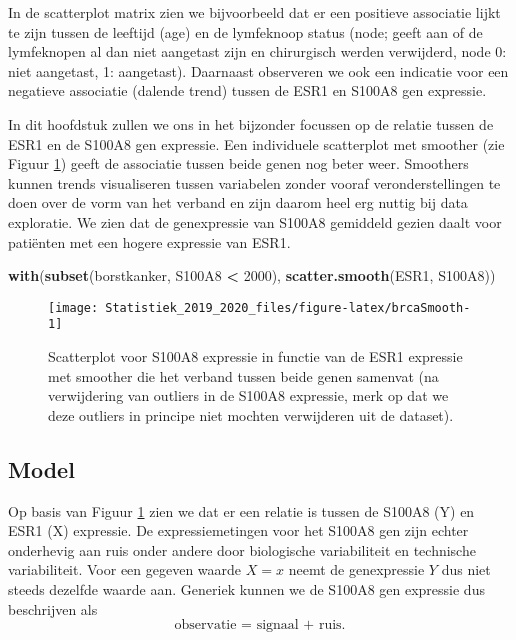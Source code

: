 \documentclass[12pt,dutch,coursenotes]{book}
\newenvironment{Shaded}{\begin{snugshade}}{\end{snugshade}}
\newcommand{\KeywordTok}[1]{\textcolor[rgb]{0.13,0.29,0.53}{\textbf{#1}}}
\newcommand{\DecValTok}[1]{\textcolor[rgb]{0.00,0.00,0.81}{#1}}
\newcommand{\StringTok}[1]{\textcolor[rgb]{0.31,0.60,0.02}{#1}}
\newcommand{\OperatorTok}[1]{\textcolor[rgb]{0.81,0.36,0.00}{\textbf{#1}}}
\newcommand{\NormalTok}[1]{#1}
\theoremstyle{definition}
\theoremstyle{definition}
\theoremstyle{definition}
\theoremstyle{remark}
\begin{document}
In de scatterplot matrix zien we bijvoorbeeld dat er een positieve
associatie lijkt te zijn tussen de leeftijd (age) en de lymfeknoop
status (node; geeft aan of de lymfeknopen al dan niet aangetast zijn en
chirurgisch werden verwijderd, node 0: niet aangetast, 1: aangetast).
Daarnaast observeren we ook een indicatie voor een negatieve associatie
(dalende trend) tussen de ESR1 en S100A8 gen expressie.

In dit hoofdstuk zullen we ons in het bijzonder focussen op de relatie
tussen de ESR1 en de S100A8 gen expressie. Een individuele scatterplot
met smoother (zie Figuur \ref{fig:brcaSmooth}) geeft de associatie
tussen beide genen nog beter weer. Smoothers kunnen trends visualiseren
tussen variabelen zonder vooraf veronderstellingen te doen over de vorm
van het verband en zijn daarom heel erg nuttig bij data exploratie. We
zien dat de genexpressie van S100A8 gemiddeld gezien daalt voor
patiënten met een hogere expressie van ESR1.

\begin{Shaded}
\begin{Highlighting}[]
\KeywordTok{with}\NormalTok{(}\KeywordTok{subset}\NormalTok{(borstkanker, S100A8 }\OperatorTok{<}\StringTok{ }\DecValTok{2000}\NormalTok{), }\KeywordTok{scatter.smooth}\NormalTok{(ESR1, }
\NormalTok{    S100A8))}
\end{Highlighting}
\end{Shaded}

\begin{figure}

{\centering \texttt{[image: Statistiek\_2019\_2020\_files/figure-latex/brcaSmooth-1]} 

}

\caption{Scatterplot voor S100A8 expressie in functie van de ESR1 expressie met smoother die het verband tussen beide genen samenvat (na verwijdering van outliers in de S100A8 expressie, merk op dat we deze outliers in principe niet mochten verwijderen uit de dataset).}\label{fig:brcaSmooth}
\end{figure}

\subsection{Model}\label{model}

Op basis van Figuur \ref{fig:brcaSmooth} zien we dat er een relatie is
tussen de S100A8 (Y) en ESR1 (X) expressie. De expressiemetingen voor
het S100A8 gen zijn echter onderhevig aan ruis onder andere door
biologische variabiliteit en technische variabiliteit. Voor een gegeven
waarde \(X=x\) neemt de genexpressie \(Y\) dus niet steeds dezelfde
waarde aan. Generiek kunnen we de S100A8 gen expressie dus beschrijven
als \[\text{observatie = signaal + ruis.}\]
\end{document}
